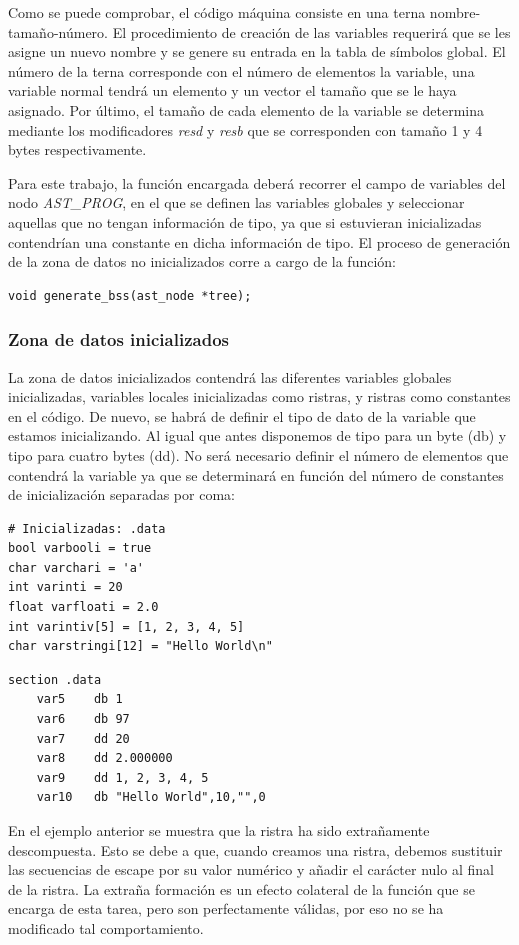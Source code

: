 \documentclass[a4paper,10pt]{article}
\begin{document}
Como se puede comprobar, el código máquina consiste en una terna nombre-tamaño-número. El procedimiento de creación de las variables requerirá que se les asigne un nuevo nombre y se genere su entrada en la tabla de símbolos global. El número de la terna corresponde con el número de elementos la variable, una variable normal tendrá un elemento y un vector el tamaño que se le haya asignado. Por último, el tamaño de cada elemento de la variable se determina mediante los modificadores \emph{resd} y \emph{resb} que se corresponden con tamaño 1 y 4 bytes respectivamente.

Para este trabajo, la función encargada deberá recorrer el campo de variables del nodo \textit{AST\_PROG}, en el que se definen las variables globales y seleccionar aquellas que no tengan información de tipo, ya que si estuvieran inicializadas contendrían una constante en dicha información de tipo. El proceso de generación de la zona de datos no inicializados corre a cargo de la función:
\begin{lstlisting}
void generate_bss(ast_node *tree);
\end{lstlisting}

\subsubsection{Zona de datos inicializados}

La zona de datos inicializados contendrá las diferentes variables globales inicializadas, variables locales inicializadas como ristras, y ristras como constantes en el código. De nuevo, se habrá de definir el tipo de dato de la variable que estamos inicializando. Al igual que antes disponemos de tipo para un byte (db) y tipo para cuatro bytes (dd). No será necesario definir el número de elementos que contendrá la variable ya que se determinará en función del número de constantes de inicialización separadas por coma:
\begin{multicols}{2}
\begin{lstlisting}[language=jam,frame=single]
# Inicializadas: .data
bool varbooli = true
char varchari = 'a'
int varinti = 20
float varfloati = 2.0
int varintiv[5] = [1, 2, 3, 4, 5]
char varstringi[12] = "Hello World\n"
\end{lstlisting}

\begin{lstlisting}[frame=single]
section .data
	var5	db 1
	var6	db 97
	var7	dd 20
	var8	dd 2.000000
	var9	dd 1, 2, 3, 4, 5
	var10	db "Hello World",10,"",0
\end{lstlisting}
\end{multicols}
En el ejemplo anterior se muestra que la ristra ha sido extrañamente descompuesta. Esto se debe a que, cuando creamos una ristra, debemos sustituir las secuencias de escape por su valor numérico y añadir el carácter nulo al final de la ristra. La extraña formación es un efecto colateral de la función que se encarga de esta tarea, pero son perfectamente válidas, por eso no se ha modificado tal comportamiento.
\end{document}
